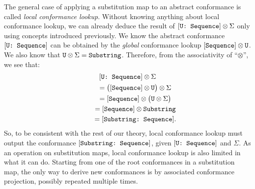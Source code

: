 \documentclass[../generics]{subfiles}
\begin{document}
The general case of applying a substitution map to an abstract conformance is called \emph{local conformance lookup}. Without knowing anything about local conformance lookup, we can already deduce the result of $[\texttt{U:~Sequence}]\otimes \Sigma$ only using concepts introduced previously. We know the abstract conformance $[\texttt{U:~Sequence}]$ can be obtained by the \emph{global} conformance lookup $[\texttt{Sequence}]\otimes\texttt{U}$. We also know that $\texttt{U}\otimes \Sigma=\texttt{Substring}$. Therefore, from the associativity of ``$\otimes$'', we see that:
\begin{gather*}
[\texttt{U:~Sequence}]\otimes \Sigma\\
\qquad {} = \bigl([\texttt{Sequence}]\otimes\texttt{U}\bigr)\otimes \Sigma\\
\qquad {} = [\texttt{Sequence}]\otimes\bigl(\texttt{U}\otimes \Sigma\bigr)\\
\qquad {} = [\texttt{Sequence}]\otimes\texttt{Substring}\\
\qquad {} = [\texttt{Substring:~Sequence}].
\end{gather*}
So, to be consistent with the rest of our theory, local conformance lookup must output the conformance $[\texttt{Substring:~Sequence}]$, given $[\texttt{U:~Sequence}]$ and $\Sigma$. As an operation on substitution maps, local conformance lookup is also limited in what it can do. Starting from one of the root conformances in a substitution map, the only way to derive new conformances is by associated conformance projection, possibly repeated multiple times.
\end{document}
